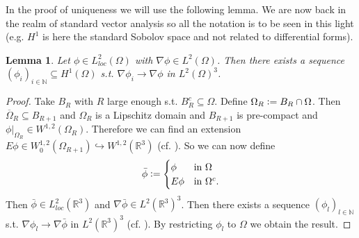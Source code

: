\documentclass[12pt,a4paper]{article}
\numberwithin{equation}{subsection}
\newtheorem{lemma}{Lemma}[section]
\numberwithin{lemma}{subsection}
\theoremstyle{definition}
\newcommand{\naturalnum}{\mathbb{N}}
\newcommand{\real}{\mathbb{R}}
\begin{document}
In the proof of uniqueness we will use the following lemma. 
We are now back in the realm of standard vector analysis so all the notation
is to be seen in this light (e.g. $H^1$ is here the standard Sobolov space 
and not related to differential forms).

\begin{lemma}
    Let $\phi \in L^2_{loc}(\Omega)$ with $\nabla \phi \in L^2(\Omega)$. Then 
    there exists a sequence $(\phi_i)_{i \in \naturalnum} \subseteq H^1(\Omega)$
    s.t. $\nabla \phi_i \rightarrow \nabla \phi$ in $L^2(\Omega)^3$.
\end{lemma}
\begin{proof}
    Take $B_R$ with $R$ large enough s.t. $B_R^c \subseteq \Omega$. 
    Define $\Omega_R \vcentcolon= B_R \cap \Omega$. Then 
    $\overline{\Omega}_R \subseteq B_{R+1}$ and $\Omega_R$ is a Lipschitz 
    domain and $B_{R+1}$ is pre-compact and
    $\phi|_{\Omega_R} \in W^{1,2}(\Omega_R)$. Therefore we can find an extension
    $E\phi \in W_0^{1,2}(\Omega_{R+1}) \hookrightarrow W^{1,2}(\mathbb{R}^3)$
    (cf. \cite[Thm.\,5.2.1]{sobolev}). So we can now define
    \begin{align*}
    \bar{\phi} \vcentcolon=
    \begin{cases}
        \phi & \mbox{in $\Omega$}\\
        E\phi & \mbox{in $\Omega^c$.}\\
    \end{cases}
    \end{align*}
    Then $\bar{\phi} \in L^2_{loc}(\real^3)$ and 
    $\nabla \bar{\phi} \in L^2(\real^3)^3$. 
    Then there exists a sequence $(\phi_l) _{l \in \naturalnum}$ s.t.
    $\nabla \phi_l \rightarrow \nabla \bar{\phi}$ in $L^2(\real^3)^3$ 
    (cf. \cite[Lemma\,1.1]{simader}). By restricting $\phi_l$ to $\Omega$ 
    we obtain the result.
\end{proof}

\end{document}

